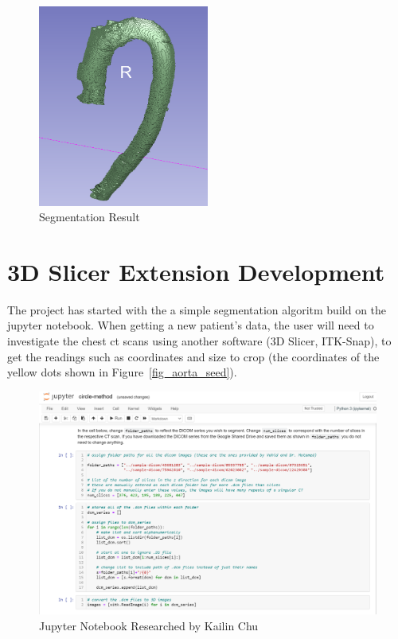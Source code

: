 \begin{figure}[H]
    \centering
    \includegraphics[width=0.5\textwidth]{figures/AGR/segmentation_result.png}
    \caption[Segmentation Result]{Segmentation Result}
    \label{fig_sr}
\end{figure}

\section{3D Slicer Extension Development}
The project has started with the a simple segmentation algoritm build on the jupyter notebook. When getting a new patient's data, the user will need to investigate the chest ct scans using another software (3D Slicer, ITK-Snap), to get the readings such as coordinates and size to crop (the coordinates of the yellow dots shown in Figure~\ref{fig_aorta_seed}).

\begin{figure}[H]
    \centering
    \includegraphics[width=\textwidth]{figures/AGR/jupyter_research.png}
    \caption[Jupyter Notebook Research]{Jupyter Notebook Researched by Kailin Chu}
    \label{fig_jnr}
\end{figure}

